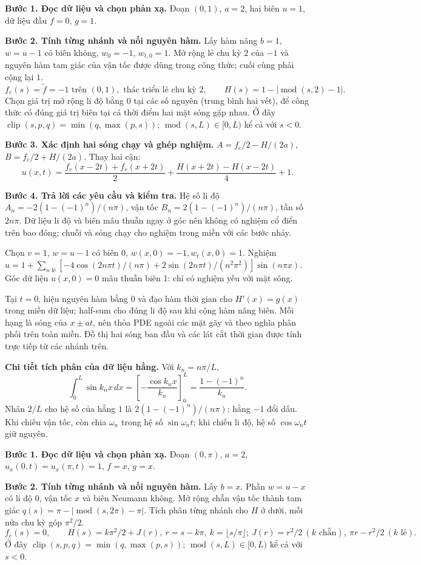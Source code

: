 \textbf{Bước 1. Đọc dữ liệu và chọn phản xạ.} Đoạn $(0,1)$, $a=2$, hai biên $u=1$, dữ liệu đầu $f=0$, $g=1$.

\textbf{Bước 2. Tính từng nhánh và nối nguyên hàm.} Lấy hàm nâng $b=1$, $w=u-1$ có biên không, $w_0=-1$, $w_{t,0}=1$. Mở rộng lẻ chu kỳ $2$ của $-1$ và nguyên hàm tam giác của vận tốc được dùng trong công thức; cuối cùng phải cộng lại $1$.
\[f_e(s)=\widetilde f=-1\text{ trên }(0,1),\text{ thác triển lẻ chu kỳ }2,\qquad H(s)=1-|\operatorname{mod}(s,2)-1|.\]
Chọn giá trị mở rộng li độ bằng $0$ tại các số nguyên (trung bình hai vết), để công thức có đúng giá trị biên tại cả thời điểm hai mặt sóng gặp nhau.
Ở đây $\operatorname{clip}(s,p,q)=\min(q,\max(p,s))$; $\operatorname{mod}(s,L)\in[0,L)$ kể cả với $s<0$.

\textbf{Bước 3. Xác định hai sóng chạy và ghép nghiệm.} $A=f_e/2-H/(2a)$, $B=f_e/2+H/(2a)$. Thay hai cận:
\[u(x,t)=\frac{f_e(x-2t)+f_e(x+2t)}2+\frac{H(x+2t)-H(x-2t)}{4}+1.\]

\textbf{Bước 4. Trả lời các yêu cầu và kiểm tra.} Hệ số li độ $A_n=-2(1-(-1)^n)/(n\pi)$, vận tốc $B_n=2(1-(-1)^n)/(n\pi)$, tần số $2n\pi$. Dữ liệu li độ và biên mâu thuẫn ngay ở góc nên không có nghiệm cổ điển trên bao đóng; chuỗi và sóng chạy cho nghiệm trong miền với các bước nhảy.

Chọn $v=1$, $w=u-1$ có biên 0, $w(x,0)=-1,w_t(x,0)=1$. Nghiệm $u=1+\sum_{n\text{ lẻ}}[-4\cos(2n\pi t)/(n\pi)+2\sin(2n\pi t)/(n^2\pi^2)]\sin(n\pi x)$. Góc dữ liệu $u(x,0)=0$ mâu thuẫn biên 1: chỉ có nghiệm yếu với mặt sóng.

Tại $t=0$, hiệu nguyên hàm bằng $0$ và đạo hàm thời gian cho $H'(x)=g(x)$ trong miền dữ liệu; half-sum cho đúng li độ sau khi cộng hàm nâng biên. Mỗi hạng là sóng của $x\pm at$, nên thỏa PDE ngoài các mặt gãy và theo nghĩa phân phối trên toàn miền. Đồ thị hai sóng ban đầu và các lát cắt thời gian được tính trực tiếp từ các nhánh trên.

\textbf{Chi tiết tích phân của dữ liệu hằng.} Với $k_n=n\pi/L$,
\[\int_0^L\sin k_nx\,dx=\left[-\frac{\cos k_nx}{k_n}\right]_0^L=\frac{1-(-1)^n}{k_n}.\]
Nhân $2/L$ cho hệ số của hằng $1$ là $2(1-(-1)^n)/(n\pi)$; hằng $-1$ đổi dấu. Khi chiếu vận tốc, còn chia $\omega_n$ trong hệ số $\sin\omega_nt$; khi chiếu li độ, hệ số $\cos\omega_nt$ giữ nguyên.

\textbf{Bước 1. Đọc dữ liệu và chọn phản xạ.} Đoạn $(0,\pi)$, $a=2$, $u_x(0,t)=u_x(\pi,t)=1$, $f=x$, $g=x$.

\textbf{Bước 2. Tính từng nhánh và nối nguyên hàm.} Lấy $b=x$. Phần $w=u-x$ có li độ $0$, vận tốc $x$ và biên Neumann không. Mở rộng chẵn vận tốc thành tam giác $q(s)=\pi-|\operatorname{mod}(s,2\pi)-\pi|$. Tích phân từng nhánh cho $H$ ở dưới, mỗi nửa chu kỳ góp $\pi^2/2$.
\[f_e(s)=0,\qquad H(s)=k\pi^2/2+J(r),\ r=s-k\pi,\ k=\lfloor s/\pi\rfloor;\ J(r)=r^2/2\ (k\text{ chẵn}),\ \pi r-r^2/2\ (k\text{ lẻ}).\]
Ở đây $\operatorname{clip}(s,p,q)=\min(q,\max(p,s))$; $\operatorname{mod}(s,L)\in[0,L)$ kể cả với $s<0$.

